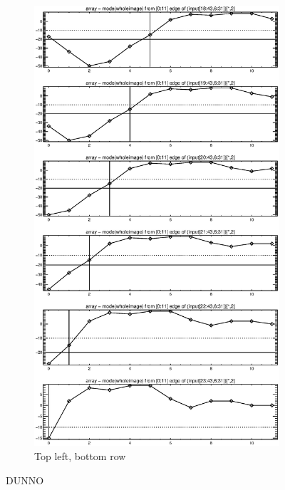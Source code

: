 \documentclass[10pt]{article}
\begin{document}
\begin{figure}[!h]
\begin{subfigure}[b]{.4\linewidth}
        \centering
        \includegraphics[width=1.4\textwidth]{../plots_tables_images/topleft3.eps} 
        \caption{Top left, bottom row}
    \end{subfigure}
    \caption{DUNNO}
\end{figure}
%
%
%
%
\end{document}
